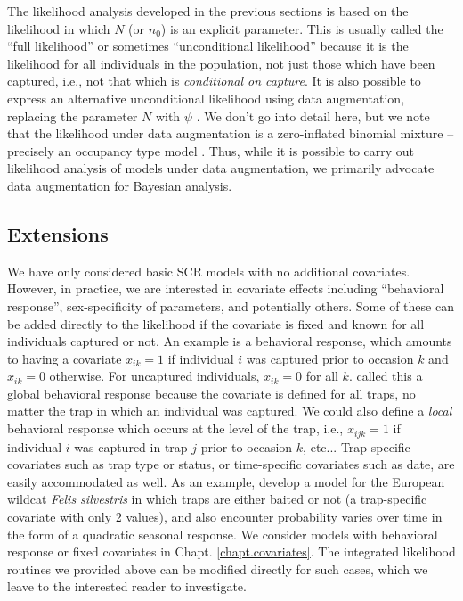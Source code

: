 The likelihood analysis developed in the previous sections is based on
the likelihood in which $N$ (or $n_{0}$) is an explicit
parameter. This is usually called the ``full likelihood'' or sometimes
``unconditional likelihood'' \citep{borchers_etal:2002} because it is
the likelihood for all individuals in the population, not just those
which have been captured, i.e., not that which is {\it conditional on
  capture}.  It is also possible to express an alternative
unconditional likelihood using data augmentation, replacing the
parameter $N$ with $\psi$ \citep[e.g., see Sec. 7.1.6][for an
example]{royle_dorazio:2008}.  We don't go into detail here, but we
note that the likelihood under data augmentation is a zero-inflated
binomial mixture -- precisely an occupancy type model
\citep{royle:2006}.  Thus, while it is possible to carry out
likelihood analysis of models under data augmentation, we primarily
advocate data augmentation for Bayesian analysis.


\subsection{Extensions}

We have only considered basic SCR models with no additional
covariates. However, in practice, we are interested in covariate
effects including ``behavioral response'', sex-specificity of
parameters, and potentially others. Some of these can be added
directly to the likelihood if the covariate is fixed and known for all
individuals captured or not. An example is a behavioral response,
which amounts to having a covariate $x_{ik}=1$ if individual $i$ was
captured prior to occasion $k$ and $x_{ik}=0$ otherwise. For
uncaptured individuals, $x_{ik}=0$ for all $k$.
\citet{royle_etal:2011jwm} called this a global behavioral response
because the covariate is defined for all traps, no matter the trap in
which an individual was captured. We could also define a {\it local}
behavioral response which occurs at the level of the trap, i.e.,
$x_{ijk}=1$ if individual $i$ was captured in trap $j$ prior to
occasion $k$, etc...  Trap-specific covariates such as trap type or
status, or time-specific covariates such as date, are easily
accommodated as well. As an example, \citet{kery_etal:2010} develop a
model for the European wildcat \emph{Felis silvestris} in which traps
are either baited or not (a trap-specific covariate with only 2
values), and also encounter probability varies over time in the form
of a quadratic seasonal response.  We consider models with behavioral
response or fixed covariates in Chapt. \ref{chapt.covariates}.  The
integrated likelihood routines we provided above can be modified
directly for such cases, which we leave to the interested reader to
investigate.


